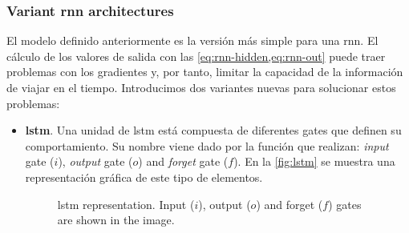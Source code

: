 \subsubsection{Variant \gls*{rnn} architectures}
El modelo definido anteriormente es la versión más simple para una
\gls{rnn}. El cálculo de los valores de salida con las
\vref{eq:rnn-hidden,eq:rnn-out} puede traer problemas con los gradientes y, por
tanto, limitar la capacidad de la información de viajar en el
tiempo. Introducimos dos variantes nuevas para solucionar estos
problemas:
\begin{itemize}
  \item \textbf{\gls*{lstm}}. Una unidad de \gls{lstm} está compuesta de
  diferentes gates que definen su comportamiento. Su nombre viene dado por la
  función que realizan: \emph{input} gate (\(i\)), \emph{output} gate (\(o\))
  and \emph{forget} gate (\(f\)). En la \vref{fig:lstm} se muestra una
  representación gráfica de este tipo de elementos.
  \begin{figure}[ht]
    \centering
    
    \caption[\acrfull*{lstm}]{\acrfull{lstm} representation. Input (\(i\)),
      output (\(o\)) and forget (\(f\)) gates are shown in the image.}
    \label{fig:lstm}
  \end{figure}


\end{itemize}
